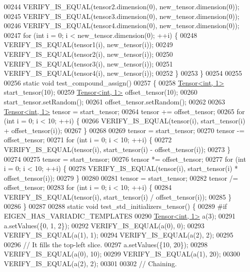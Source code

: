 \begin{DoxyCode}
00244   VERIFY\_IS\_EQUAL(tensor2.dimension(0), new\_tensor.dimension(0));
00245   VERIFY\_IS\_EQUAL(tensor3.dimension(0), new\_tensor.dimension(0));
00246   VERIFY\_IS\_EQUAL(tensor4.dimension(0), new\_tensor.dimension(0));
00247   \textcolor{keywordflow}{for} (\textcolor{keywordtype}{int} i = 0; i < new\_tensor.dimension(0); ++i) \{
00248     VERIFY\_IS\_EQUAL(tensor1(i), new\_tensor(i));
00249     VERIFY\_IS\_EQUAL(tensor2(i), new\_tensor(i));
00250     VERIFY\_IS\_EQUAL(tensor3(i), new\_tensor(i));
00251     VERIFY\_IS\_EQUAL(tensor4(i), new\_tensor(i));
00252   \}
00253 \}
00254 
00255 
00256 \textcolor{keyword}{static} \textcolor{keywordtype}{void} test\_compound\_assign()
00257 \{
00258   \hyperlink{class_eigen_1_1_tensor}{Tensor<int, 1>} start\_tensor(10);
00259   \hyperlink{class_eigen_1_1_tensor}{Tensor<int, 1>} offset\_tensor(10);
00260   start\_tensor.setRandom();
00261   offset\_tensor.setRandom();
00262 
00263   \hyperlink{class_eigen_1_1_tensor}{Tensor<int, 1>} tensor = start\_tensor;
00264   tensor += offset\_tensor;
00265   \textcolor{keywordflow}{for} (\textcolor{keywordtype}{int} i = 0; i < 10; ++i) \{
00266     VERIFY\_IS\_EQUAL(tensor(i), start\_tensor(i) + offset\_tensor(i));
00267   \}
00268 
00269   tensor = start\_tensor;
00270   tensor -= offset\_tensor;
00271   \textcolor{keywordflow}{for} (\textcolor{keywordtype}{int} i = 0; i < 10; ++i) \{
00272     VERIFY\_IS\_EQUAL(tensor(i), start\_tensor(i) - offset\_tensor(i));
00273   \}
00274 
00275   tensor = start\_tensor;
00276   tensor *= offset\_tensor;
00277   \textcolor{keywordflow}{for} (\textcolor{keywordtype}{int} i = 0; i < 10; ++i) \{
00278     VERIFY\_IS\_EQUAL(tensor(i), start\_tensor(i) * offset\_tensor(i));
00279   \}
00280 
00281   tensor = start\_tensor;
00282   tensor /= offset\_tensor;
00283   \textcolor{keywordflow}{for} (\textcolor{keywordtype}{int} i = 0; i < 10; ++i) \{
00284     VERIFY\_IS\_EQUAL(tensor(i), start\_tensor(i) / offset\_tensor(i));
00285   \}
00286 \}
00287 
00288 \textcolor{keyword}{static} \textcolor{keywordtype}{void} test\_std\_initializers\_tensor() \{
00289 \textcolor{preprocessor}{#if EIGEN\_HAS\_VARIADIC\_TEMPLATES}
00290   \hyperlink{class_eigen_1_1_tensor}{Tensor<int, 1>} a(3);
00291   a.setValues(\{0, 1, 2\});
00292   VERIFY\_IS\_EQUAL(a(0), 0);
00293   VERIFY\_IS\_EQUAL(a(1), 1);
00294   VERIFY\_IS\_EQUAL(a(2), 2);
00295 
00296   \textcolor{comment}{// It fills the top-left slice.}
00297   a.setValues(\{10, 20\});
00298   VERIFY\_IS\_EQUAL(a(0), 10);
00299   VERIFY\_IS\_EQUAL(a(1), 20);
00300   VERIFY\_IS\_EQUAL(a(2), 2);
00301 
00302   \textcolor{comment}{// Chaining.}

\end{DoxyCode}
